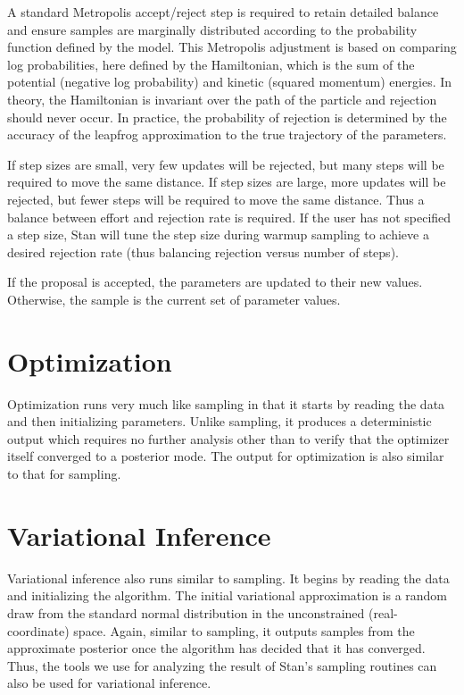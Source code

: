 A standard Metropolis accept/reject step is required to retain detailed
balance and ensure samples are marginally distributed according to the
probability function defined by the model.  This Metropolis adjustment
is based on comparing log probabilities, here defined by the
Hamiltonian, which is the sum of the potential (negative log
probability) and kinetic (squared momentum) energies.  In theory, the
Hamiltonian is invariant over the path of the particle and rejection
should never occur.  In practice, the probability of rejection is
determined by the accuracy of the leapfrog approximation to the true
trajectory of the parameters.

If step sizes are small, very few updates will be rejected, but many
steps will be required to move the same distance.  If step sizes are
large, more updates will be rejected, but fewer steps will be required
to move the same distance.  Thus a balance between effort and
rejection rate is required.  If the user has not specified a step
size, Stan will tune the step size during warmup sampling to achieve
a desired rejection rate (thus balancing rejection versus number of
steps).

If the proposal is accepted, the parameters are updated to their new
values.  Otherwise, the sample is the current set of parameter values.


\section{Optimization}

Optimization runs very much like sampling in that it starts by reading
the data and then initializing parameters.  Unlike sampling, it
produces a deterministic output which requires no further analysis
other than to verify that the optimizer itself converged to a
posterior mode.  The output for optimization is also similar to that
for sampling.


\section{Variational Inference}

Variational inference also runs similar to sampling. It begins by reading the
data and initializing the algorithm. The initial variational approximation is a
random draw from the standard normal distribution in the unconstrained
(real-coordinate) space. Again, similar to sampling, it outputs samples from the
approximate posterior once the algorithm has decided that it has converged.
Thus, the tools we use for analyzing the result of Stan's sampling routines can
also be used for variational inference.



